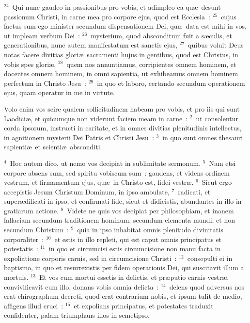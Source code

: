 ${}^{24}$~Qui nunc gaudeo in passionibus pro vobis, et adimpleo ea qu\ae\ desunt passionum Christi, in carne mea pro corpore ejus, quod est Ecclesia~:
${}^{25}$~cujus factus sum ego minister secundum dispensationem Dei, qu\ae\ data est mihi in vos, ut impleam verbum Dei~:
${}^{26}$~mysterium, quod absconditum fuit a s\ae culis, et generationibus, nunc autem manifestatum est sanctis ejus,
${}^{27}$~quibus voluit Deus notas facere divitias glori\ae\ sacramenti hujus in gentibus, quod est Christus, in vobis spes glori\ae ,
${}^{28}$~quem nos annuntiamus, corripientes omnem hominem, et docentes omnem hominem, in omni sapientia, ut exhibeamus omnem hominem perfectum in Christo Jesu~:
${}^{29}$~in quo et laboro, certando secundum operationem ejus, quam operatur in me in virtute.

\lettrine[lines=3,image=true,loversize=0.05,lraise=-0.03]{V}{}olo enim vos scire qualem sollicitudinem habeam pro vobis, et pro iis qui sunt Laodici\ae , et quicumque non viderunt faciem meam in carne~:
${}^{2}$~ut consolentur corda ipsorum, instructi in caritate, et in omnes divitias plenitudinis intellectus, in agnitionem mysterii Dei Patris et Christi Jesu~:
${}^{3}$~in quo sunt omnes thesauri sapienti\ae\ et scienti\ae\ absconditi.


${}^{4}$~Hoc autem dico, ut nemo vos decipiat in sublimitate sermonum.
${}^{5}$~Nam etsi corpore absens sum, sed spiritu vobiscum sum~: gaudens, et videns ordinem vestrum, et firmamentum ejus, qu\ae\ in Christo est, fidei vestr\ae .
${}^{6}$~Sicut ergo accepistis Jesum Christum Dominum, in ipso ambulate,
${}^{7}$~radicati, et super\ae dificati in ipso, et confirmati fide, sicut et didicistis, abundantes in illo in gratiarum actione.
${}^{8}$~Videte ne quis vos decipiat per philosophiam, et inanem fallaciam secundum traditionem hominum, secundum elementa mundi, et non secundum Christum~:
${}^{9}$~quia in ipso inhabitat omnis plenitudo divinitatis corporaliter~:
${}^{10}$~et estis in illo repleti, qui est caput omnis principatus et potestatis~:
${}^{11}$~in quo et circumcisi estis circumcisione non manu facta in expoliatione corporis carnis, sed in circumcisione Christi~:
${}^{12}$~consepulti ei in baptismo, in quo et resurrexistis per fidem operationis Dei, qui suscitavit illum a mortuis.
${}^{13}$~Et vos cum mortui essetis in delictis, et pr\ae putio carnis vestr\ae , convivificavit cum illo, donans vobis omnia delicta~:
${}^{14}$~delens quod adversus nos erat chirographum decreti, quod erat contrarium nobis, et ipsum tulit de medio, affigens illud cruci~:
${}^{15}$~et expolians principatus, et potestates traduxit confidenter, palam triumphans illos in semetipso.


